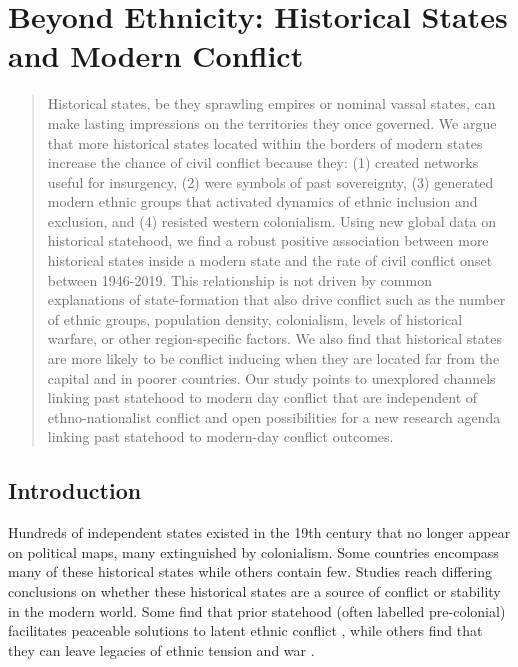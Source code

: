 
\chapter{Beyond Ethnicity: Historical States and Modern Conflict}


\begin{abstract} Historical states, be they sprawling empires or nominal vassal
	states, can make lasting impressions on the territories they once
	governed. We argue that more historical states located within the
	borders of modern states increase the chance of civil conflict because
	they: (1) created networks useful for insurgency, (2) were symbols of
	past sovereignty, (3) generated modern ethnic groups that activated
	dynamics of ethnic inclusion and exclusion, and (4) resisted western
	colonialism. Using new global data on historical statehood, we find a
	robust positive association between more historical states inside a
	modern state and the rate of civil conflict onset between 1946-2019.
	This relationship is not driven by common explanations of
	state-formation that also drive conflict such as the number of ethnic
	groups, population density, colonialism, levels of historical warfare,
	or other region-specific factors. We also find that historical states
	are more likely to be conflict inducing when they are located far from
	the capital and in poorer countries. Our study points to unexplored
	channels linking past statehood to modern day conflict that are
	independent of ethno-nationalist conflict and open possibilities for a
	new research agenda linking past statehood to modern-day conflict
	outcomes.

\end{abstract}

\bigskip {}

\pagebreak


\section{Introduction}

Hundreds of independent states existed in the 19th century that no longer appear on political maps, many extinguished by colonialism. Some
countries encompass many of these historical states while others contain few.
Studies reach differing conclusions on whether these historical states are a
source of conflict or stability in the modern world. Some find that prior
statehood (often labelled pre-colonial) facilitates peaceable solutions to
latent ethnic conflict \citep{Depetris-Chauvin2016, Wig2016}, while others find
that they can leave legacies of ethnic tension and war \citep{Besley2014,
Paine2019, Englebert2000, Alesina2003}. 

